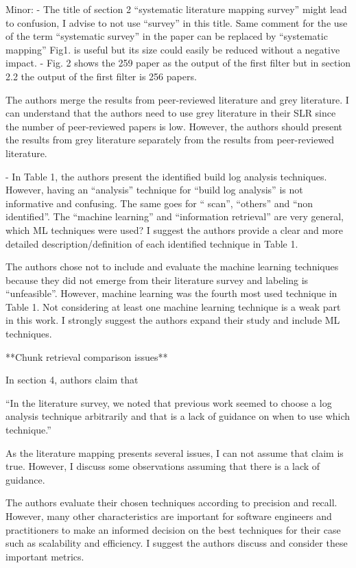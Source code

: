 \documentclass[10pt,a4wide]{article}
\renewenvironment{leftbar}{%
	\vspace{0.1cm}
	\def\FrameCommand{\vrule width 0.4pt \hspace{15pt}}%
	\MakeFramed {\advance\hsize-\width \FrameRestore}}%
{\endMakeFramed\vspace{0.1cm}}
\begin{document}
\begin{leftbar}
Minor:
- The title of section 2 “systematic literature mapping survey” might lead to confusion, I advise to not use “survey” in this title. Same comment for the use of the term “systematic survey” in the paper can be replaced by “systematic mapping”
Fig1. is useful but its size could easily be reduced without a negative impact.
- Fig. 2 shows the 259 paper as the output of the first filter but in section 2.2 the output of the first filter is 256 papers.

The authors merge the results from peer-reviewed literature and grey literature. I can understand that the authors need to use grey literature in their SLR since the number of peer-reviewed papers is low. However, the authors should present the results from grey literature separately from the results from peer-reviewed literature.

- In Table 1, the authors present the identified build log analysis techniques. However, having an “analysis” technique for “build log analysis” is not informative and confusing. The same goes for “ scan”, “others” and “non identified”. The “machine learning” and “information retrieval” are very general, which ML techniques were used? I suggest the authors provide a clear and more detailed description/definition of each identified technique in Table 1.

The authors chose not to include and evaluate the machine learning techniques because they did not emerge from their literature survey and labeling is “unfeasible”. However, machine learning was the fourth most used technique in Table 1. Not considering at least one machine learning technique is a weak part in this work. I strongly suggest the authors expand their study and include ML techniques.    


**Chunk retrieval comparison issues**

In section 4, authors claim that

“In the literature survey, we noted that previous work seemed to choose a log analysis technique arbitrarily and that is a lack of guidance on when to use which technique.”

As the literature mapping presents several issues, I can not assume that claim is true. However, I discuss some observations assuming that there is a lack of guidance.

The authors evaluate their chosen techniques according to precision and recall. However, many other characteristics are important for software engineers and practitioners to make an informed decision on the best techniques for their case such as scalability and efficiency. I suggest the authors discuss and consider these important metrics.


\end{leftbar}
\end{document}

